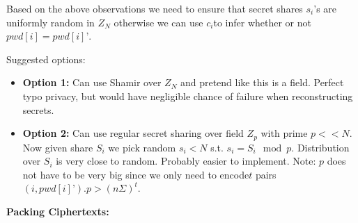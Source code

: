 Based on the above observations we need to ensure that secret shares $ s_i $’s are uniformly random in $ Z_N $ otherwise we can use $ c_i  $to infer whether or not  $  pwd[i]=pwd[i]’ $. 


Suggested options: 

\begin{itemize}
	\item \textbf{Option 1:} Can use Shamir over $ Z_N $ and pretend like this is a field. Perfect typo privacy, but would have negligible chance of failure when reconstructing secrets.
	
	\item \textbf{Option 2:} Can use regular secret sharing over field $  Z_p $ with prime $ p << N $. Now given share $  S_i $ we pick random $ s_i < N $ s.t. $ s_i = S_i \mod p $. Distribution over $ S_i $ is very close to random. Probably easier to implement. Note: $ p $ does not have to be very big since we only need to encode$  t $ pairs $  (i,pwd[i]’). p > (n \Sigma)^t $.
\end{itemize}

\textbf{Packing Ciphertexts:}

